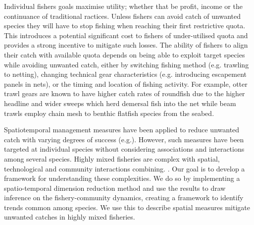 \documentclass{nature}
\begin{document}
\begin{linenumbers}
 Individual fishers goals  maximise utility; whether that be profit, income or the
continuance of traditional ractices.   Unless
fishers can avoid catch of unwanted species they will have to stop fishing when
reaching their first restrictive quota. This introduces a potential significant
cost to fishers of under-utilised quota\cite{Ulrich2016} and provides a strong
incentive to mitigate such losses\cite{Condie2013}. The ability of fishers to
align their catch with available quota depends on being able to exploit target
species while avoiding unwanted catch, either by switching fishing
method (e.g.  trawling to netting), changing technical gear characteristics
(e.g.  introducing escapement panels in nets), or the timing and location of
fishing activity\cite{vanPutten2012a}. For example, otter trawl gears are known
to have higher catch rates of roundfish due to the higher headline and wider
sweeps which herd demersal fish into the net while beam trawls employ chain
mesh to  benthic flatfish species from the
seabed\cite{Fraser2008}.

Spatiotemporal management measures  have been applied to reduce unwanted catch with varying
degrees of success (e.g.\cite{Needle2011, Dunn2014a}).  However, such measures
have  been targeted at individual species without
considering associations and interactions among several species. Highly mixed
fisheries are complex with spatial, technological and community interactions
combining.  .  Our goal is to
develop a framework for understanding these complexities. We do so by
implementing a spatio-temporal dimension reduction method and use the results
to draw inference on the fishery-community dynamics, creating a framework to
identify trends common among species. We use this to describe
 spatial
measures  mitigate
unwanted catches in highly mixed fisheries.



\end{linenumbers}
\end{document}
